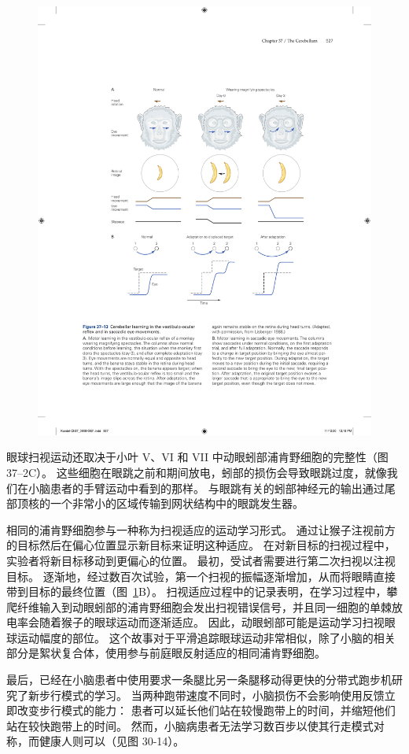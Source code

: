 \begin{figure}[htbp]
	\centering
	\includegraphics[width=0.8\linewidth]{chap37/fig_37_13}
	\caption{}
	\label{fig:37_13}
\end{figure}


眼球扫视运动还取决于小叶 V、VI 和 VII 中动眼蚓部浦肯野细胞的完整性（图 37–2C）。
这些细胞在眼跳之前和期间放电，蚓部的损伤会导致眼跳过度，就像我们在小脑患者的手臂运动中看到的那样。
与眼跳有关的蚓部神经元的输出通过尾部顶核的一个非常小的区域传输到网状结构中的眼跳发生器。


相同的浦肯野细胞参与一种称为扫视适应的运动学习形式。
通过让猴子注视前方的目标然后在偏心位置显示新目标来证明这种适应。
在对新目标的扫视过程中，实验者将新目标移动到更偏心的位置。
最初，受试者需要进行第二次扫视以注视目标。
逐渐地，经过数百次试验，第一个扫视的振幅逐渐增加，从而将眼睛直接带到目标的最终位置（图~\ref{fig:37_13}B）。
扫视适应过程中的记录表明，在学习过程中，攀爬纤维输入到动眼蚓部的浦肯野细胞会发出扫视错误信号，并且同一细胞的单棘放电率会随着猴子的眼球运动而逐渐适应。
因此，动眼蚓部可能是运动学习扫视眼球运动幅度的部位。
这个故事对于平滑追踪眼球运动非常相似，除了小脑的相关部分是絮状复合体，使用参与前庭眼反射适应的相同浦肯野细胞。


最后，已经在小脑患者中使用要求一条腿比另一条腿移动得更快的分带式跑步机研究了新步行模式的学习。
当两种跑带速度不同时，小脑损伤不会影响使用反馈立即改变步行模式的能力：
患者可以延长他们站在较慢跑带上的时间，并缩短他们站在较快跑带上的时间。
然而，小脑病患者无法学习数百步以使其行走模式对称，而健康人则可以（见图 30-14）。



